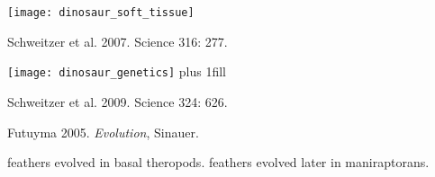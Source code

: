 \documentclass[t]{beamer}
\begin{document}
{
\begin{frame}[b,plain]
\end{frame}
}

{
\begin{frame}[b,plain]
\begin{center}
	\texttt{[image: dinosaur\_soft\_tissue]}
\end{center}
\vfill
\tiny\hfill Schweitzer et al. 2007. Science 316: 277.
\end{frame}
}

{
\begin{frame}[b,plain]
	\hspace{-1em}\texttt{[image: dinosaur\_genetics]}
\vskip0pt plus 1fill

\tiny\hfill Schweitzer et al. 2009. Science 324: 626.
\end{frame}
}

{
\begin{frame}[b,plain]
\tiny Futuyma 2005. \textit{Evolution}, Sinauer.
\end{frame}
}

{
\begin{frame}[b,plain]{ feathers evolved in basal theropods.  feathers evolved later in maniraptorans.}

\end{frame}
}

{
\begin{frame}[b,plain]
\end{frame}
}
\end{document}
